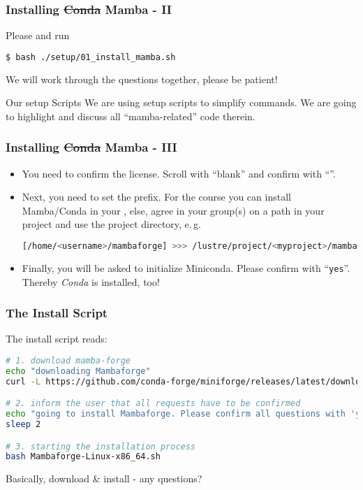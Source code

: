 \begin{frame}[fragile]
  \frametitle{Installing \sout{Conda} Mamba - II}
  Please and run
  \begin{lstlisting}[language=Bash, style=Shell]
$ bash ./setup/01_install_mamba.sh
  \end{lstlisting}
  We will work through the questions together, please be patient!
  \begin{block}{Our setup Scripts}
   We are using setup scripts to simplify commands. We are going to highlight and discuss all ``mamba-related'' code therein.
  \end{block}
\end{frame}

\begin{frame}[fragile]
  \frametitle{Installing \sout{Conda} Mamba - III}
  \begin{itemize}[<+->]
   \item You need to confirm the license. Scroll with ``blank'' and confirm with ``''.
   \item Next, you need to set the prefix. For the course you can install Mamba/Conda in your , else, agree in your group(s) on a path in your project and use the project directory, e.\,g. 
   \begin{lstlisting}[language=Bash, style=Shell, breaklines=true ]
[/home/<username>/mambaforge] >>> /lustre/project/<myproject>/mambaforge
   \end{lstlisting}
   \item Finally, you will be asked to initialize Miniconda. Please confirm with ``\verb+yes+''. Thereby \emph{Conda} is installed, too!
  \end{itemize}
\end{frame}

\begin{frame}[fragile]
  \frametitle{The Install Script}
  The install script reads:
  \begin{lstlisting}[language=Bash, style=Shell]
# 1. download mamba-forge
echo "downloading Mambaforge"
curl -L https://github.com/conda-forge/miniforge/releases/latest/download/Mambaforge-Linux-x86_64.sh -o Mambaforge-Linux-x86_64.sh

# 2. inform the user that all requests have to be confirmed
echo "going to install Mambaforge. Please confirm all questions with 'yes'"
sleep 2

# 3. starting the installation process
bash Mambaforge-Linux-x86_64.sh
  \end{lstlisting}
  Basically, download \& install - any questions?
\end{frame}

